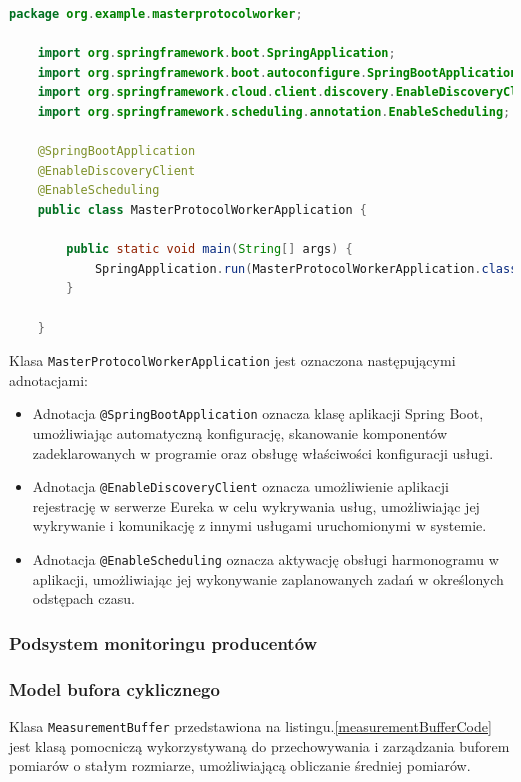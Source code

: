 \begin{lstlisting}[language=Java, caption=Główna klasa węzła protokołu, label=protocolWorkerMainClass]
    package org.example.masterprotocolworker;

    import org.springframework.boot.SpringApplication;
    import org.springframework.boot.autoconfigure.SpringBootApplication;
    import org.springframework.cloud.client.discovery.EnableDiscoveryClient;
    import org.springframework.scheduling.annotation.EnableScheduling;
    
    @SpringBootApplication
    @EnableDiscoveryClient
    @EnableScheduling
    public class MasterProtocolWorkerApplication {
    
        public static void main(String[] args) {
            SpringApplication.run(MasterProtocolWorkerApplication.class, args);
        }
    
    }
\end{lstlisting}

Klasa \verb|MasterProtocolWorkerApplication| jest oznaczona następującymi adnotacjami:
\begin{itemize}
    \item Adnotacja \verb|@SpringBootApplication| oznacza klasę aplikacji Spring Boot, umożliwiając automatyczną konfigurację, skanowanie komponentów zadeklarowanych w programie oraz obsługę właściwości konfiguracji usługi.
    \item Adnotacja \verb|@EnableDiscoveryClient| oznacza umożliwienie aplikacji rejestrację w serwerze Eureka w celu wykrywania usług, umożliwiając jej wykrywanie i komunikację z innymi usługami uruchomionymi w systemie.
    \item Adnotacja \verb|@EnableScheduling| oznacza aktywację obsługi harmonogramu w aplikacji, umożliwiając jej wykonywanie zaplanowanych zadań w określonych odstępach czasu.
\end{itemize}

\subsubsection{Podsystem monitoringu producentów}

\subsubsection{Model bufora cyklicznego}

Klasa \verb|MeasurementBuffer| przedstawiona na listingu.\ref{measurementBufferCode} jest klasą pomocniczą wykorzystywaną do przechowywania i zarządzania buforem pomiarów o stałym rozmiarze, umożliwiającą obliczanie średniej pomiarów.

